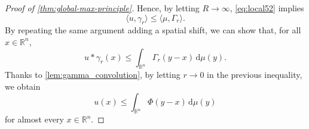 \documentclass[10pt, reqno]{amsart}
\theoremstyle{plain}
\theoremstyle{remark}
\theoremstyle{definition}
\numberwithin{equation}{section}
\theoremstyle{plain}
\newcommand{\R}{\ensuremath{\mathbb R}} %
\newcommand{\scalprod}[1]{\ensuremath{\langle #1\rangle}} %
\begin{document}
\begin{proof}[Proof of \cref{thm:global-max-principle}]
    Hence, by letting $R\to\infty$, \cref{eq:local52} implies
    \begin{equation*}
        \scalprod{u, \gamma_r} \le \scalprod{\mu, \Gamma_r}.
    \end{equation*}
    By repeating the same argument adding a spatial shift, we can show that, for all $x\in\R^n$,
    \begin{equation*}
        u\ast \gamma_r(x) \le \int_{\R^n} \Gamma_r(y-x)\, \mathrm{d} \mu(y).
    \end{equation*}
    Thanks to \cref{lem:gamma_convolution}, by letting $r\to 0$ in the previous inequality, we obtain
    \begin{equation*}
        u(x) \le \int_{\R^n} \Phi(y-x)\, \mathrm{d} \mu(y)
    \end{equation*}
    for almost every $x\in\R^n$. 
\end{proof}
\end{document}
